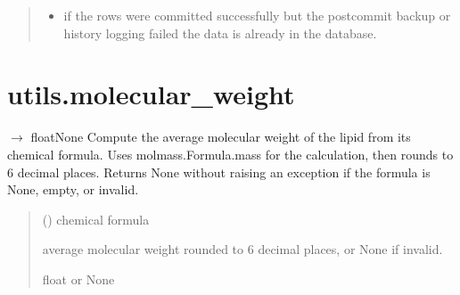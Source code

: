 \documentclass[letterpaper,10pt,english]{sphinxmanual}
\begin{document}
\begin{fulllineitems}
\begin{quote}
\begin{description}
\begin{itemize}
\item {} 
\sphinxAtStartPar
{} \textendash{} if the rows were committed successfully but the post\sphinxhyphen{}commit
backup or history logging failed \sphinxhyphen{} the data is already in the database.

\end{itemize}

\end{description}\end{quote}

\end{fulllineitems}



\section{utils.molecular\_weight}
\label{\detokenize{api:module-utils.molecular_weight}}\label{\detokenize{api:utils-molecular-weight}}

\begin{fulllineitems}
\label{\detokenize{api:utils.molecular_weight.molecular_weight}}
\pysigstartsignatures
\pysiglinewithargsret
{}
{}
{{ $\rightarrow$ floatNone}}
\pysigstopsignatures
\sphinxAtStartPar
Compute the average molecular weight of the lipid from its chemical formula.
Uses molmass.Formula.mass for the calculation, then rounds to 6 decimal places.
Returns None without raising an exception if the formula is None, empty, or invalid.
\begin{quote}\begin{description}
\sphinxAtStartPar
{} () \textendash{} chemical formula

\sphinxAtStartPar
average molecular weight rounded to 6 decimal places, or None if invalid.

\sphinxAtStartPar
float or None

\end{description}\end{quote}

\end{fulllineitems}
\end{document}
